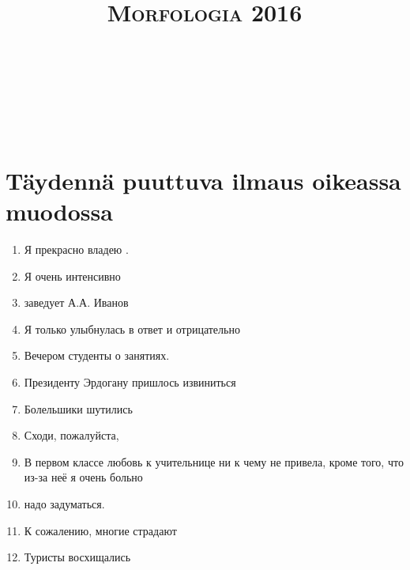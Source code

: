\documentclass[paper=a4, fontsize=11pt]{scrartcl}
\title{	
\normalfont \normalsize 
\textsc{Morfologia 2016} \\ [25pt] 
\horrule{0.5pt} \\[0.4cm] 
\huge  \\ 
\horrule{2pt} \\[0.5cm] 
}
\date{}
\begin{document}
\onehalfspacing

\section{Täydennä puuttuva ilmaus oikeassa muodossa}

\begin{enumerate}
    \item Я прекрасно владею .
    \item Я очень интенсивно 
    \item {} заведует А.А. Иванов
    \item Я только улыбнулась в ответ и отрицательно 
    \item Вечером студенты  о занятиях.
    \item Президенту Эрдогану пришлось извиниться \raisebox{-\baselineskip}{\shortstack{\underline{\hspace{5cm}}\\puolue}}
    \item Болельшики шутились \raisebox{-\baselineskip}{\shortstack{\underline{\hspace{5cm}}\\maalivahti}}
    \item Сходи, пожалуйста, \raisebox{-\baselineskip}{\shortstack{\underline{\hspace{5cm}}\\maito}}
    \item В первом классе любовь к учительнице ни к чему не привела, кроме того, что из-за неё я очень больно 
    \item {} надо задуматься.
    \item  К сожалению, многие страдают 
    \item Туристы восхищались 
\end{enumerate}
\end{document}
